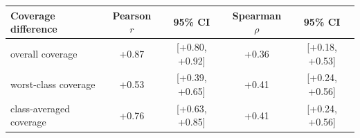\begin{tabular}{lcccc}
\toprule
Coverage difference & Pearson $r$ & 95\% CI & Spearman $\rho$ & 95\% CI \\
\midrule
overall coverage & +0.87 & [+0.80, +0.92] & +0.36 & [+0.18, +0.53] \\
worst-class coverage & +0.53 & [+0.39, +0.65] & +0.41 & [+0.24, +0.56] \\
class-averaged coverage & +0.76 & [+0.63, +0.85] & +0.41 & [+0.24, +0.56] \\
\bottomrule
\end{tabular}
